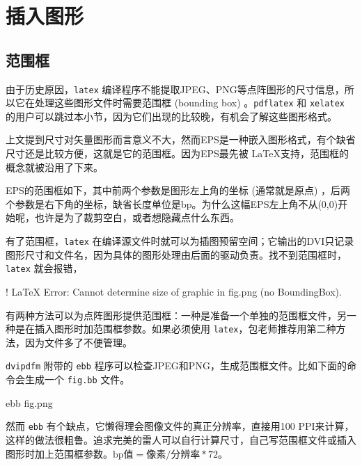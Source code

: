 \section{插入图形}
\label{sec:includegraphics}

\subsection{范围框}

由于历史原因，\texttt{latex} 编译程序不能提取JPEG、PNG等点阵图形的尺寸信息，所以它在处理这些图形文件时需要范围框 (bounding box) 。\texttt{pdflatex} 和 \texttt{xelatex} 的用户可以跳过本小节，因为它们出现的比较晚，有机会了解这些图形格式。

上文提到尺寸对矢量图形而言意义不大，然而EPS是一种嵌入图形格式，有个缺省尺寸还是比较方便，这就是它的范围框。因为EPS最先被 \LaTeX 支持，范围框的概念就被沿用了下来。

EPS的范围框如下，其中前两个参数是图形左上角的坐标 (通常就是原点) ，后两个参数是右下角的坐标，缺省长度单位是bp。为什么这幅EPS左上角不从(0,0)开始呢，也许是为了裁剪空白，或者想隐藏点什么东西。

\begin{Code}[]
\end{Code}

有了范围框，\texttt{latex} 在编译源文件时就可以为插图预留空间；它输出的DVI只记录图形尺寸和文件名，因为具体的图形处理由后面的驱动负责。找不到范围框时，\texttt{latex} 就会报错，

\begin{Code}[]
! LaTeX Error: Cannot determine size of graphic in fig.png (no BoundingBox).
\end{Code}

有两种方法可以为点阵图形提供范围框：一种是准备一个单独的范围框文件，另一种是在插入图形时加范围框参数。如果必须使用 \texttt{latex}，包老师推荐用第二种方法，因为文件多了不便管理。

\texttt{dvipdfm} 附带的 \texttt{ebb} 程序可以检查JPEG和PNG，生成范围框文件。比如下面的命令会生成一个 \texttt{fig.bb} 文件。

\begin{Code}[]
ebb fig.png
\end{Code}

然而 \texttt{ebb} 有个缺点，它懒得理会图像文件的真正分辨率，直接用100 PPI来计算，这样的做法很粗鲁。追求完美的雷人可以自行计算尺寸，自己写范围框文件或插入图形时加上范围框参数。$ \text{bp值} = \text{像素} / \text{分辨率} * 72 $。

